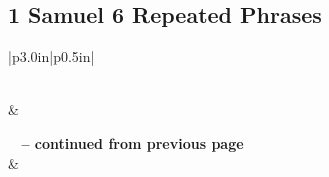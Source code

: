 \subsection{1 Samuel 6 Repeated Phrases}


\normalsize
 
\begin{center}
\begin{longtable}{|p{3.0in}|p{0.5in}|}
\caption[1 Samuel 6 Repeated Phrases]{1 Samuel 6 Repeated Phrases}\label{table:Repeated Phrases 1 Samuel 6} \\
\hline {} &  \\ \hline 
\endfirsthead
 
{{\bfseries \tablename\ \thetable{} -- continued from previous page}} \\  
\hline {} &  \\ \hline 
\endhead
 

\end{longtable}
\end{center}
